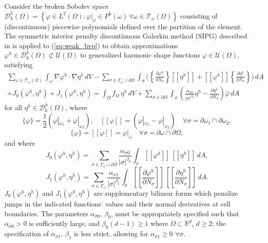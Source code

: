 	Consider the broken Sobolev space $\mathcal{D}^h_k (\Omega) = \left\{ \varphi \in L^2 (\Omega) : \varphi|_{\omega} \in P^k (\omega) \, \forall \omega \in \mathcal{T}_\omega (\Omega) \right\}$ consisting of (discontinuous) piecewise polynomials defined over the partition of the element. The symmetric interior penalty discontinuous Galerkin method (SIPG) described in \cite{Riviere:08} is applied to (\ref{eq:weak_bvp}) to obtain approximations $\varphi^h \in \mathcal{D}^h_k (\Omega) \not\subset \mathcal{U} (\Omega)$ to generalized harmonic shape functions $\varphi \in \mathcal{U} (\Omega)$, satisfying
	\begin{eqnarray}
		\sum_{\omega \in \mathcal{T}_\omega (\Omega)} \int_{\omega} \nabla \varphi^h \cdot \nabla \eta^h \, dV - \sum_{\sigma \in \Gamma_\omega \cup \partial \Omega} \int_{\sigma} \bigg( \left\{ \frac{\partial \varphi^h}{\partial N_{\sigma}} \right\} [\![ \eta^h ]\!] + [\![ \varphi^h ]\!] \left\{ \frac{\partial \eta^h}{\partial N_{\sigma}} \right\}  \bigg) \, dA \nonumber \\ + J_0 (\varphi^h,\eta^h) + J_1 (\varphi^h,\eta^h) = \int_{\Omega} f_{\Omega} \, \eta^h \, dV + \sum_{\sigma \in \partial \Omega} \int_{\sigma} \left(\frac{\alpha_{\sigma0}}{|\sigma|^{\beta_0}} \eta^h - \frac{\partial \eta^h}{\partial N_{\sigma}} \right) \bar{\varphi} \, dA
		\label{eq:dg_poisson}
	\end{eqnarray}
	for all $\eta^h \in \mathcal{D}^h_k (\Omega)$, where
	\begin{equation}
		\{ \varphi \} = \frac{1}{2} (\varphi|_{\omega_1} + \varphi|_{\omega_2}), \quad [\![ \varphi ]\!] = (\varphi|_{\omega_1} - \varphi|_{\omega_2}) \quad \forall \sigma = \partial \omega_1 \cap \partial \omega_2,
	\end{equation}
	\begin{equation}
		\{ \varphi \} = [\![ \varphi ]\!] = \varphi|_{\omega} \quad \forall \sigma = \partial \omega \cap \partial \Omega,
	\end{equation}
	and where
	\begin{equation}
		J_0 (\varphi^h,\eta^h) = \sum_{\sigma \in \Gamma_\omega \cup \partial \Omega} \frac{\alpha_{\sigma0}}{|\sigma|^{\beta_0}} \int_{\sigma} [\![ \varphi^h ]\!] \, [\![ \eta^h ]\!] \, dA,
	\end{equation}
	\begin{equation}
		J_1 (\varphi^h,\eta^h) = \sum_{\sigma \in \Gamma_\omega} \frac{\alpha_{\sigma1}}{|\sigma|^{\beta_1}} \int_{\sigma} \left[\!\!\left[ \frac{\partial \varphi^h}{\partial N_{\sigma}} \right]\!\!\right] \, \left[\!\!\left[ \frac{\partial \eta^h}{\partial N_{\sigma}} \right]\!\!\right] \, dA.
	\end{equation}
	$J_0 (\varphi^h,\eta^h)$ and $J_1 (\varphi^h,\eta^h)$ are supplementary bilinear forms which penalize jumps in the indicated functions' values and their normal derivatives at cell boundaries. The parameters $\alpha_{\sigma0}$, $\beta_0$, must be appropriately specified such that $\alpha_{\sigma0} > 0$ is sufficiently large, and $\beta_0 (d-1) \geq 1$ where $\Omega \subset \mathbb{R}^d$, $d \geq 2$; the specification of $\alpha_{\sigma1}$, $\beta_1$ is less strict, allowing for $\alpha_{\sigma1} \geq 0 \, \, \forall \sigma$.
	
